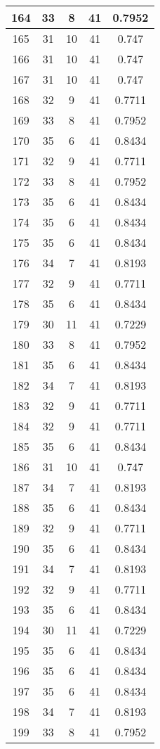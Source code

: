 \documentclass[letterpaper, 12pt]{article}
\begin{document}
\begin{longtable}{|c|c|c|c|c|}
\hline
164 & 33 & 8 & 41 & 0.7952 \\
\hline
165 & 31 & 10 & 41 & 0.747 \\
\hline
166 & 31 & 10 & 41 & 0.747 \\
\hline
167 & 31 & 10 & 41 & 0.747 \\
\hline
168 & 32 & 9 & 41 & 0.7711 \\
\hline
169 & 33 & 8 & 41 & 0.7952 \\
\hline
170 & 35 & 6 & 41 & 0.8434 \\
\hline
171 & 32 & 9 & 41 & 0.7711 \\
\hline
172 & 33 & 8 & 41 & 0.7952 \\
\hline
173 & 35 & 6 & 41 & 0.8434 \\
\hline
174 & 35 & 6 & 41 & 0.8434 \\
\hline
175 & 35 & 6 & 41 & 0.8434 \\
\hline
176 & 34 & 7 & 41 & 0.8193 \\
\hline
177 & 32 & 9 & 41 & 0.7711 \\
\hline
178 & 35 & 6 & 41 & 0.8434 \\
\hline
179 & 30 & 11 & 41 & 0.7229 \\
\hline
180 & 33 & 8 & 41 & 0.7952 \\
\hline
181 & 35 & 6 & 41 & 0.8434 \\
\hline
182 & 34 & 7 & 41 & 0.8193 \\
\hline
183 & 32 & 9 & 41 & 0.7711 \\
\hline
184 & 32 & 9 & 41 & 0.7711 \\
\hline
185 & 35 & 6 & 41 & 0.8434 \\
\hline
186 & 31 & 10 & 41 & 0.747 \\
\hline
187 & 34 & 7 & 41 & 0.8193 \\
\hline
188 & 35 & 6 & 41 & 0.8434 \\
\hline
189 & 32 & 9 & 41 & 0.7711 \\
\hline
190 & 35 & 6 & 41 & 0.8434 \\
\hline
191 & 34 & 7 & 41 & 0.8193 \\
\hline
192 & 32 & 9 & 41 & 0.7711 \\
\hline
193 & 35 & 6 & 41 & 0.8434 \\
\hline
194 & 30 & 11 & 41 & 0.7229 \\
\hline
195 & 35 & 6 & 41 & 0.8434 \\
\hline
196 & 35 & 6 & 41 & 0.8434 \\
\hline
197 & 35 & 6 & 41 & 0.8434 \\
\hline
198 & 34 & 7 & 41 & 0.8193 \\
\hline
199 & 33 & 8 & 41 & 0.7952 \\
\hline
\end{longtable}
\end{document}

